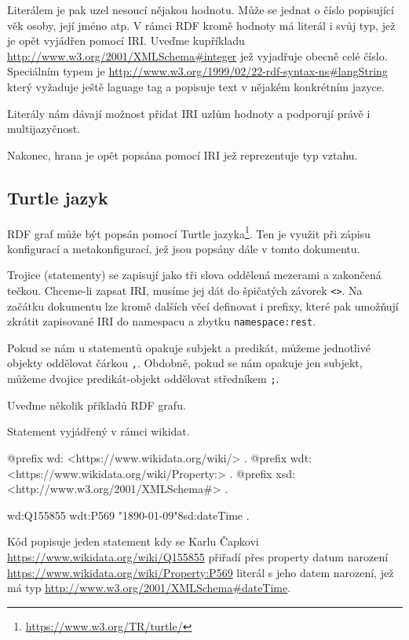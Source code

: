 Literálem je pak uzel nesoucí nějakou hodnotu. Může se jednat o číslo popisující věk osoby, její jméno atp. V rámci RDF kromě hodnoty má literál i svůj typ, jež je opět vyjádřen pomocí IRI. Uveďme kupříkladu \url{http://www.w3.org/2001/XMLSchema#integer} jež vyjadřuje obecně celé číslo. Speciálním typem je \url{http://www.w3.org/1999/02/22-rdf-syntax-ns#langString} který vyžaduje ještě laguage tag a popisuje text v nějakém konkrétním jazyce.

Literály nám dávají možnost přidat IRI uzlům hodnoty a podporují právě i multijazyčnost.

Nakonec, hrana je opět popsána pomocí IRI jež reprezentuje typ vztahu.

\newpage

\subsection{Turtle jazyk}
RDF graf může být popsán pomocí Turtle jazyka\footnote{\url{https://www.w3.org/TR/turtle/}}. Ten je využit při zápisu konfigurací a metakonfigurací, jež jsou popsány dále v tomto dokumentu.

Trojice (statementy) se zapisují jako tři slova oddělená mezerami a zakončená tečkou. Chceme-li zapsat IRI, musíme jej dát do špičatých závorek \texttt{<>}. Na začátku dokumentu lze kromě dalších věcí definovat i prefixy, které pak umožňují zkrátit zapisované IRI do namespacu a zbytku \texttt{namespace:rest}.

Pokud se nám u statementů opakuje subjekt a predikát, můžeme jednotlivé objekty oddělovat čárkou \texttt{,}. Obdobně, pokud se nám opakuje jen subjekt, můžeme dvojice predikát-objekt oddělovat středníkem \texttt{;}.

Uveďme několik příkladů RDF grafu.

\begin{prikl}
Statement  vyjádřený v rámci wikidat.
\begin{code}
@prefix wd: <https://www.wikidata.org/wiki/> .
@prefix wdt: <https://www.wikidata.org/wiki/Property:> .
@prefix xsd: <http://www.w3.org/2001/XMLSchema#> .

wd:Q155855 wdt:P569 "1890-01-09"^^xsd:dateTime .
\end{code}

Kód popisuje jeden statement kdy se Karlu Čapkovi \\ \url{https://www.wikidata.org/wiki/Q155855} přiřadí přes property datum narození \url{https://www.wikidata.org/wiki/Property:P569} literál s jeho datem narození, jež má typ \url{http://www.w3.org/2001/XMLSchema#dateTime}.
\end{prikl}

